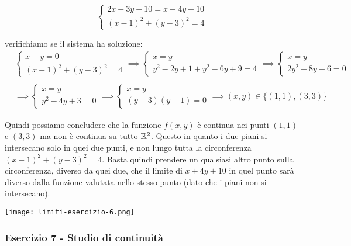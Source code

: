 \begin{equation*}
    \begin{cases}
        2x+3y+10 = x +4y +10 \\
        {(x-1)}^{2} + {(y-3)}^{2} = 4
    \end{cases}
\end{equation*}

verifichiamo se il sistema ha soluzione:
\begin{align*}
     & \begin{cases}
           x-y=0 \\
           {(x-1)}^{2} + {(y-3)}^{2} = 4
       \end{cases}\implies
    \begin{cases}
        x=y \\
        y^{2}-2y+1+y^{2}-6y+9=4
    \end{cases} \implies
    \begin{cases}
        x=y \\
        2y^{2}-8y + 6 = 0
    \end{cases}                 \\ \\
     & \implies \begin{cases}
                    x=y \\
                    y^{2}-4y+3=0
                \end{cases} \implies
    \begin{cases}
        x=y \\
        (y-3)(y-1) = 0
    \end{cases} \implies
    (x,y) \in \{(1,1), (3,3)\}
\end{align*}

Quindi possiamo concludere che la funzione \(f(x,y)\) è continua nei punti \((1,1)\) e \((3,3)\) ma non è continua su tutto \(\mathbb{R}^2\). Questo in quanto i due piani si intersecano solo in quei due punti, e non lungo tutta la circonferenza \({(x-1)}^{2}+{(y-3)}^{2} = 4\). Basta quindi prendere un qualsiasi altro punto sulla circonferenza, diverso da quei due, che il limite di \(x+4y+10\) in quel punto sarà diverso dalla funzione valutata nello stesso punto (dato che i piani non si intersecano).

\begin{center}
    \texttt{[image: limiti-esercizio-6.png]}
\end{center}

\filbreak{}
\subsubsection*{Esercizio 7 {-} Studio di continuità}

